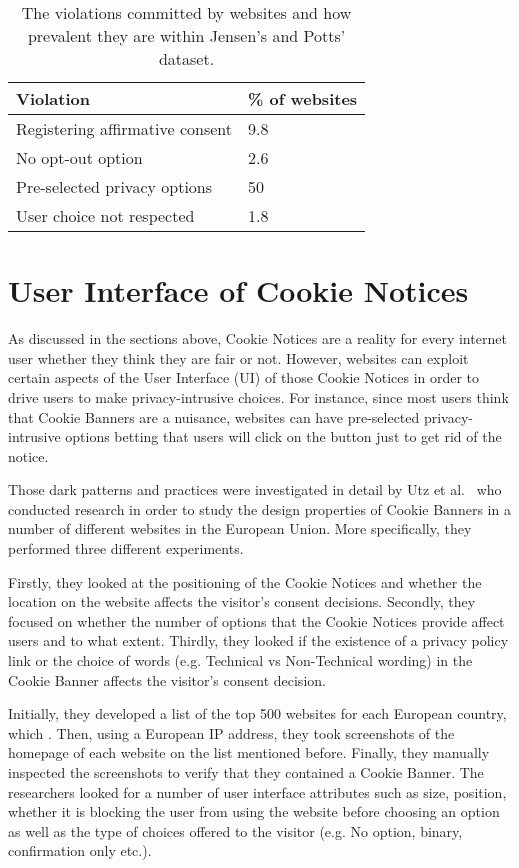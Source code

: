 \documentclass[../main.tex]{subfiles}
\begin{document}
\begin{table}[ht]
    \centering
    \begin{tabular}{@{}ll@{}}
        \toprule
        \textbf{Violation}           & \textbf{\% of websites} \\ \midrule
        Registering affirmative consent & 9.8                     \\
        No opt-out option            & 2.6                     \\
        Pre-selected privacy options & 50                      \\
        User choice not respected    & 1.8                     \\ \bottomrule
    \end{tabular}
    \caption{The violations committed by websites and how prevalent they are within Jensen's and Potts' dataset.}
    \label{tab:matte}
\end{table}

\section{User Interface of Cookie Notices}
As discussed in the sections above, Cookie Notices are a reality for every internet user whether they think they are fair or not. However, websites can exploit certain aspects of the User Interface (UI) of those Cookie Notices in order to drive users to make privacy-intrusive choices. For instance, since most users think that Cookie Banners are a nuisance, websites can have pre-selected privacy-intrusive options betting that users will click on the  button just to get rid of the notice. 

Those dark patterns and practices were investigated in detail by Utz et al.~\cite{utz2019informed} who conducted research in order to study the design properties of Cookie Banners in a number of different websites in the European Union. More specifically, they performed three different experiments. 

Firstly, they looked at the positioning of the Cookie Notices and whether the location on the website affects the visitor’s consent decisions. Secondly, they focused on whether the number of options that the Cookie Notices provide affect users and to what extent. Thirdly, they looked if the existence of a privacy policy link or the choice of words (e.g. Technical vs Non-Technical wording) in the Cookie Banner affects the visitor’s consent decision. 

Initially, they developed a list of the top 500 websites for each European country, which . Then, using a European IP address, they took screenshots of the homepage of each website on the list mentioned before. Finally, they manually inspected the screenshots to verify that they contained a Cookie Banner. The researchers looked for a number of user interface attributes such as size, position, whether it is blocking the user from using the website before choosing an option as well as the type of choices offered to the visitor (e.g. No option, binary, confirmation only etc.). 
\end{document}
